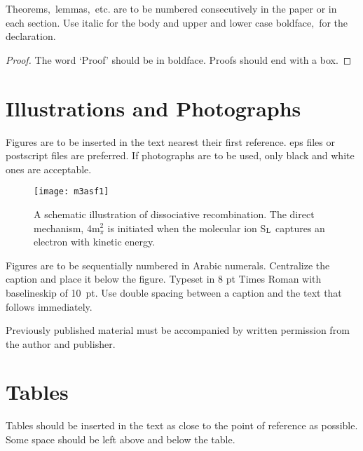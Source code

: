 \documentclass{ws-m3as}
\begin{document}
\begin{lemma}\label{lem1}
Theorems$,$ lemmas$,$ etc. are to be numbered
consecutively in the paper or in each section. Use italic for the
body and upper and lower case boldface$,$ for the declaration.
\end{lemma}

\begin{proof}
The word `Proof' should be in boldface. Proofs
should end with a box.
\end{proof}

\section{Illustrations and Photographs}
Figures are to be inserted in the text nearest their first
reference. eps files or postscript files are preferred. If
photographs are to be used, only black and white ones are acceptable.

\begin{figure}[pb]
\centerline{\texttt{[image: m3asf1]}}
\vspace*{8pt}
\caption{A schematic illustration of dissociative recombination. The
direct mechanism, 4m$^2_\pi$ is initiated when the
molecular ion S$_{\rm L}$ captures an electron with kinetic energy.}
\end{figure}

Figures are to be sequentially numbered in Arabic numerals.
Centralize the caption and place it below the figure.
Typeset in 8 pt Times Roman with
baselineskip of 10~pt. Use double spacing between a
caption and the text that follows immediately.

Previously published material must be accompanied by written
permission from the author and publisher.

\section{Tables}
Tables should be inserted in the text as close to the point of
reference as possible. Some space should be left above and below
the table.
\end{document}

